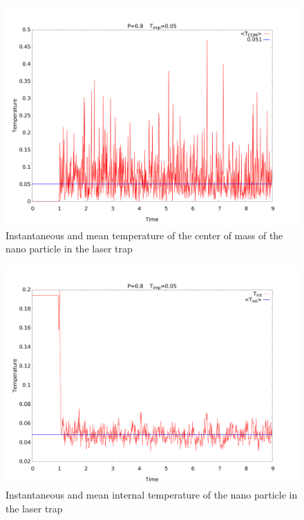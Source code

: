 \documentclass[12pt]{article}
\begin{document}
\begin{figure}[h]
    \begin{center}
        \includegraphics[scale=0.4]{images/vcomsqd.pdf}
        \caption{Instantaneous and mean temperature of the center of mass of the nano particle in the laser trap}
        \label{fig:vcomsqdequib}
    \end{center}
\end{figure}
\begin{figure}[h]
    \begin{center}
        \includegraphics[scale=0.4]{images/t_int.pdf}
        \caption{Instantaneous and mean internal temperature of the nano particle in the laser trap}
        \label{fig:internalequib}
    \end{center}
\end{figure}
\end{document}
